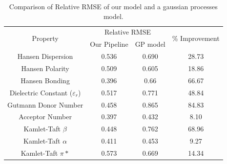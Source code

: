 \documentclass[
  english,        %
  font=times,     %
  onecolumn,      %
]{article}
\begin{document}
\begin{table}[h!]

\centering
\begin{tabular}{cccc}
\toprule
\multirow{2}{*}{Property}        & \multicolumn{2}{c}{Relative RMSE} & \multirow{2}{*}{\% Improvement} \\
                                 & Our Pipeline   & GP model  &                               \\
                                 \midrule
Hansen Dispersion                & 0.536          & 0.690            & 28.73                              \\

Hansen Polarity                  & 0.509          & 0.605            & 18.86                             \\

Hansen Bonding                   & 0.396          & 0.66            & 66.67                              \\

Dielectric Constant ($\varepsilon_r$) & 0.517          & 0.771            & 48.84                              \\

Gutmann Donor Number                     & 0.458          & 0.865            & 84.83                              \\
Acceptor Number                 & 0.397         & 0.432           & 8.10                             \\
Kamlet-Taft $\beta$              & 0.448          & 0.762            & 68.96                              \\

Kamlet-Taft $\alpha$                     & 0.411               & 0.453          & 9.27                             \\
Kamlet-Taft $\pi*$                  & 0.573         & 0.669            & 14.34                           \\
\bottomrule
\end{tabular}
\caption{Comparison of Relative RMSE of our model and a gaussian processes model. }\label{tab:compariosn_models}
\end{table}





\end{document}
